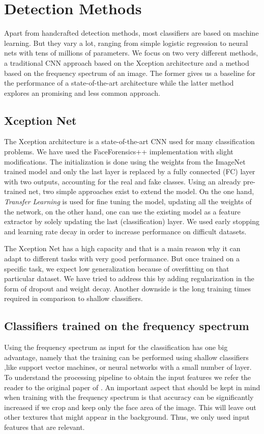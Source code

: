 \documentclass[11pt]{article}
\begin{document}
\section{Detection Methods}
Apart from handcrafted detection methods, most classifiers are based on machine learning. But they vary a lot, ranging from simple logistic regression to neural nets with tens of millions of parameters. We focus on two very different methods, a traditional CNN approach based on the Xception architecture and a method based on the frequency spectrum of an image. The former gives us a baseline for the performance of a state-of-the-art architecture while the latter method explores an promising and less common approach.

\subsection{Xception Net}
The Xception architecture \cite{chollet2017xception} is a state-of-the-art CNN used for many classification problems. We have used the FaceForensics++ implementation with slight modifications. The initialization is done using the weights from the ImageNet trained model and only the last layer is replaced by a fully connected (FC) layer with two outputs, accounting for the real and fake classes. Using an already pre-trained net, two simple approaches exist to extend the model. On the one hand, \emph{Transfer Learning} is used for fine tuning the model, updating all the weights of the network, on the other hand, one can use the existing model as a feature extractor by solely updating the last (classification) layer. We used early stopping and learning rate decay in order to increase performance on difficult datasets.

The Xception Net has a high capacity and that is a main reason why it can adapt to different tasks with very good performance. But once trained on a specific task, we expect low generalization because of overfitting on that particular dataset. We have tried to address this by adding regularization in the form of dropout and weight decay. Another downside is the long training times required in comparison to shallow classifiers.

\subsection{Classifiers trained on the frequency spectrum}
Using the frequency spectrum as input for the classification has one big advantage, namely that the training can be performed using shallow classifiers ,like support vector machines, or neural networks with a small number of layer. To understand the processing pipeline to obtain the input features we refer the reader to the original paper of \cite{durall2020unmasking}. An important aspect that should be kept in mind when training with the frequency spectrum is that accuracy can be significantly increased if we crop and keep only the face area of the image. This will leave out other textures that might appear in the background. Thus, we only used input features that are relevant.
\end{document}
